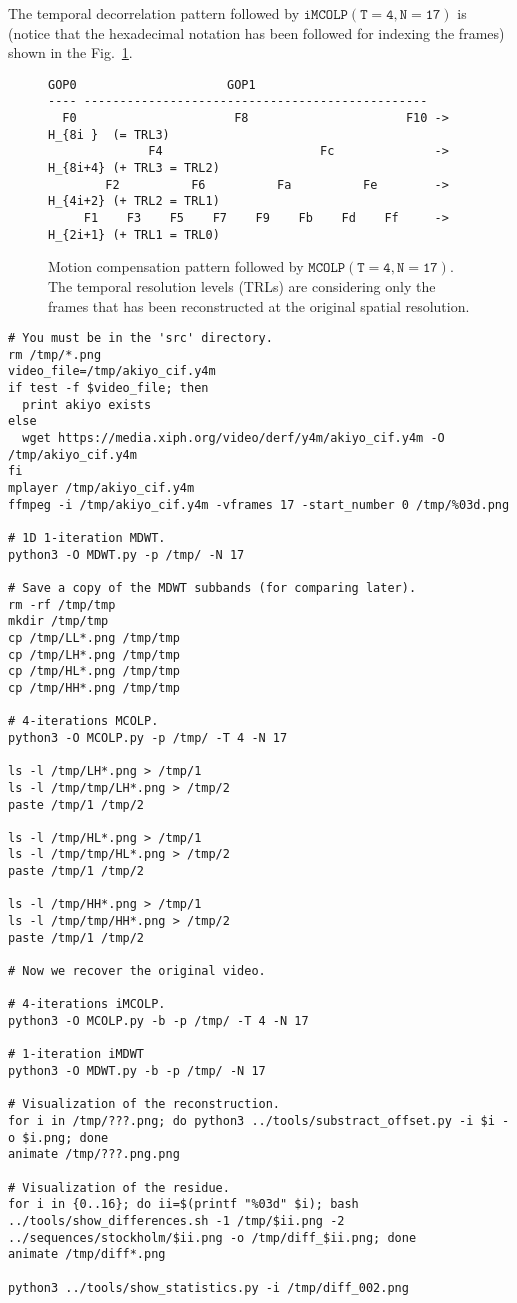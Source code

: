 The temporal decorrelation pattern followed by $\mathtt{iMCOLP(T=4,
  N=17)}$ is (notice that the hexadecimal notation has been followed
for indexing the frames) shown in the Fig.~\ref{fig:PRMC_4_17}.

\begin{figure}
\begin{verbatim}
GOP0                     GOP1
---- ------------------------------------------------
  F0                      F8                      F10 -> H_{8i }  (= TRL3)
              F4                      Fc              -> H_{8i+4} (+ TRL3 = TRL2)
        F2          F6          Fa          Fe        -> H_{4i+2} (+ TRL2 = TRL1)
     F1    F3    F5    F7    F9    Fb    Fd    Ff     -> H_{2i+1} (+ TRL1 = TRL0)
\end{verbatim}
\caption{Motion compensation pattern followed by $\mathtt{MCOLP(T=4,
    N=17)}$. The temporal resolution levels (TRLs) are considering
  only the frames that has been reconstructed at the original spatial
  resolution.}
\label{fig:PRMC_4_17}
\end{figure}

\begin{verbatim}
# You must be in the 'src' directory.
rm /tmp/*.png
video_file=/tmp/akiyo_cif.y4m
if test -f $video_file; then
  print akiyo exists
else
  wget https://media.xiph.org/video/derf/y4m/akiyo_cif.y4m -O /tmp/akiyo_cif.y4m
fi
mplayer /tmp/akiyo_cif.y4m
ffmpeg -i /tmp/akiyo_cif.y4m -vframes 17 -start_number 0 /tmp/%03d.png

# 1D 1-iteration MDWT.
python3 -O MDWT.py -p /tmp/ -N 17

# Save a copy of the MDWT subbands (for comparing later).
rm -rf /tmp/tmp
mkdir /tmp/tmp
cp /tmp/LL*.png /tmp/tmp
cp /tmp/LH*.png /tmp/tmp
cp /tmp/HL*.png /tmp/tmp
cp /tmp/HH*.png /tmp/tmp

# 4-iterations MCOLP.
python3 -O MCOLP.py -p /tmp/ -T 4 -N 17

ls -l /tmp/LH*.png > /tmp/1
ls -l /tmp/tmp/LH*.png > /tmp/2
paste /tmp/1 /tmp/2

ls -l /tmp/HL*.png > /tmp/1
ls -l /tmp/tmp/HL*.png > /tmp/2
paste /tmp/1 /tmp/2

ls -l /tmp/HH*.png > /tmp/1
ls -l /tmp/tmp/HH*.png > /tmp/2
paste /tmp/1 /tmp/2

# Now we recover the original video.

# 4-iterations iMCOLP.
python3 -O MCOLP.py -b -p /tmp/ -T 4 -N 17

# 1-iteration iMDWT
python3 -O MDWT.py -b -p /tmp/ -N 17

# Visualization of the reconstruction.
for i in /tmp/???.png; do python3 ../tools/substract_offset.py -i $i -o $i.png; done
animate /tmp/???.png.png

# Visualization of the residue.
for i in {0..16}; do ii=$(printf "%03d" $i); bash ../tools/show_differences.sh -1 /tmp/$ii.png -2 ../sequences/stockholm/$ii.png -o /tmp/diff_$ii.png; done
animate /tmp/diff*.png

python3 ../tools/show_statistics.py -i /tmp/diff_002.png
\end{verbatim}

